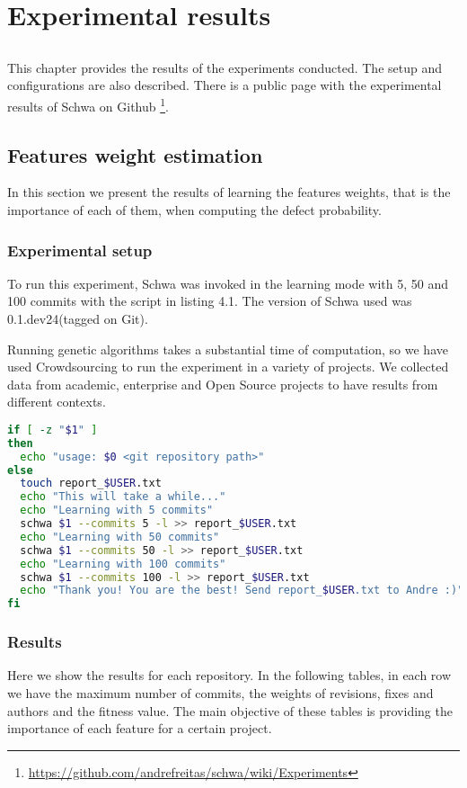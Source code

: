 \chapter{Experimental results} \label{chap:results}

\section*{}
This chapter provides the results of the experiments conducted. The setup and
configurations are also described. There is a public page with the experimental
results of Schwa on Github \footnote{\url{https://github.com/andrefreitas/schwa/wiki/Experiments}}.

\section{Features weight estimation}
In this section we present the results of learning the features weights, that is
the importance of each of them, when computing the defect probability.

\subsection{Experimental setup}
To run this experiment, Schwa was invoked in the learning mode with 5, 50 and
100 commits with the script in listing 4.1. The version of Schwa used was
0.1.dev24(tagged on Git).

Running genetic algorithms takes a substantial time of computation, so we have
used Crowdsourcing to run the experiment in a variety of projects. We collected
data from academic, enterprise and Open Source projects to have results from
different contexts.

\begin{lstlisting}[language=bash, caption=Shell script used to learn features weights]
if [ -z "$1" ]
then
  echo "usage: $0 <git repository path>"
else
  touch report_$USER.txt
  echo "This will take a while..."
  echo "Learning with 5 commits"
  schwa $1 --commits 5 -l >> report_$USER.txt
  echo "Learning with 50 commits"
  schwa $1 --commits 50 -l >> report_$USER.txt
  echo "Learning with 100 commits"
  schwa $1 --commits 100 -l >> report_$USER.txt
  echo "Thank you! You are the best! Send report_$USER.txt to Andre :)"
fi
\end{lstlisting}

\subsection{Results}
Here we show the results for each repository. In the following tables, in each
row we have the maximum number of commits, the weights of revisions, fixes and
authors and the fitness value. The main objective of these tables is providing
the importance of each feature for a certain project.

